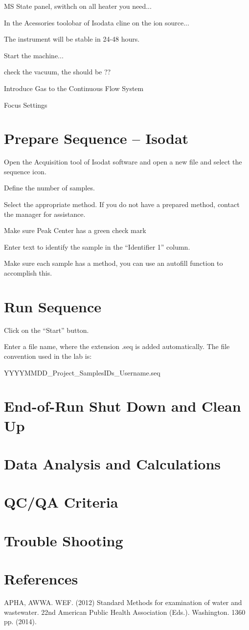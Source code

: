 \documentclass[12pt]{../SOP3}\usepackage[]{graphicx}\usepackage[]{color}
\begin{document}
\NP MS State panel, swithch on all heater you need...

\NP In the Acessories toolobar of Isodata cline on the ion source...

\NP The instrument will be stable in 24-48 hours.

\NP Start the machine...

\NP check the vacuum, the should be ??

\NP Introduce Gas to the Continuous Flow System

\NP Focus Settings





\section{Prepare Sequence -- Isodat}

\NP Open the Acquisition tool of Isodat software and open a new file and select the sequence icon. 

\NP Define the number of samples. 

\NP Select the appropriate method. If you do not have a prepared method, contact the manager for assistance. 

\NP Make sure Peak Center has a green check mark

\NP Enter text to identify the sample in the ``Identifier 1'' column.

\NP Make sure each sample has a method, you can use an autofill function to accomplish this.

\section{Run Sequence}

\NP Click on the ``Start'' button.

\NP Enter a file name, where the extension .seq is added automatically. The file convention used in the lab is:

\medskip

YYYYMMDD\_Project\_SamplesIDs\_Username.seq

\section{End-of-Run Shut Down and Clean Up}

\NP

\section{Data Analysis and Calculations}

\section{QC/QA Criteria}

\section{Trouble Shooting}

\section{References}

\NP APHA, AWWA. WEF. (2012) Standard Methods for examination of water and wastewater. 22nd American Public Health Association (Eds.). Washington. 1360 pp. (2014).
\end{document}
